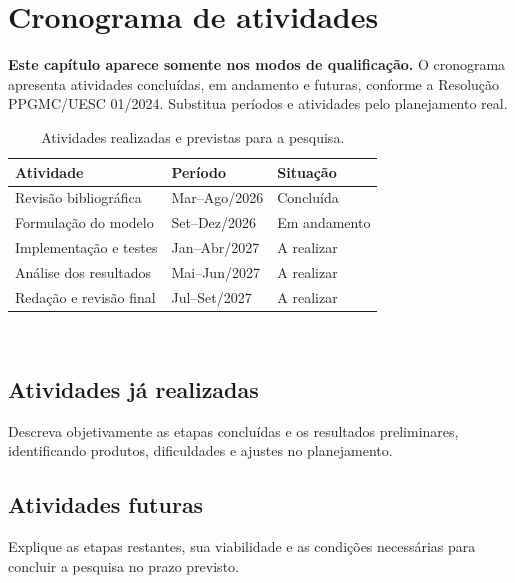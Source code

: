 \chapter{Cronograma de atividades}\label{chap:cronograma}
\textbf{Este capítulo aparece somente nos modos de qualificação.} O cronograma apresenta atividades concluídas, em andamento e futuras, conforme a Resolução PPGMC/UESC 01/2024. Substitua períodos e atividades pelo planejamento real.
\begin{table}[htbp]\centering\caption{Atividades realizadas e previstas para a pesquisa.}
\begin{tabularx}{\textwidth}{Xll}\toprule
Atividade & Período & Situação\\\midrule
Revisão bibliográfica & Mar--Ago/2026 & Concluída\\
Formulação do modelo & Set--Dez/2026 & Em andamento\\
Implementação e testes & Jan--Abr/2027 & A realizar\\
Análise dos resultados & Mai--Jun/2027 & A realizar\\
Redação e revisão final & Jul--Set/2027 & A realizar\\\bottomrule
\end{tabularx}\\[2pt]
\end{table}
\section{Atividades já realizadas}
Descreva objetivamente as etapas concluídas e os resultados preliminares, identificando produtos, dificuldades e ajustes no planejamento.
\section{Atividades futuras}
Explique as etapas restantes, sua viabilidade e as condições necessárias para concluir a pesquisa no prazo previsto.
